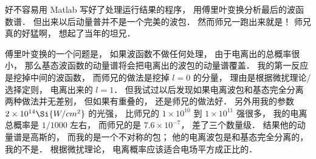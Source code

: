 好不容易用 Matlab 写好了处理运行结果的程序， 用傅里叶变换分析最后的波函数谱． 但出来以后动量普并不是一个完美的波包． 然而师兄一跑出来就是！ 师兄真的好猛啊， 想起了当年的坦兄．

傅里叶变换的一个问题是， 如果波函数不做任何处理， 由于电离出的总概率很小， 那么基态波函数的动量谱将会把电离出的波包的动量谱覆盖． 我的第一反应是挖掉中间的波函数， 而师兄的做法是挖掉 $l = 0$ 的分量， 理由是根据微扰理论/选择定则， 电离出来的 $l = 1$． 但我试过以后发现如果电离波包和基态完全分离两种做法并无差别， 但如果有重叠的， 还是师兄的做法好． 另外用我的参数 $2\times 10^{14} \Si{W/cm^2}$ 的光强， 比师兄的 $1\times 10^{10}$ 到 $1\times 10^{11}$ 强很多， 我的电离总概率是 $1/1000$ 左右， 而师兄的是 $7.6\times 10^{-7}$， 差了三个数量级． 结果他的动量谱是高斯的， 而我的是一个不对称的包； 他的电离波包是和基态完全分离的， 我的不是． 根据微扰理论， 电离概率应该适合电场平方成正比的．
